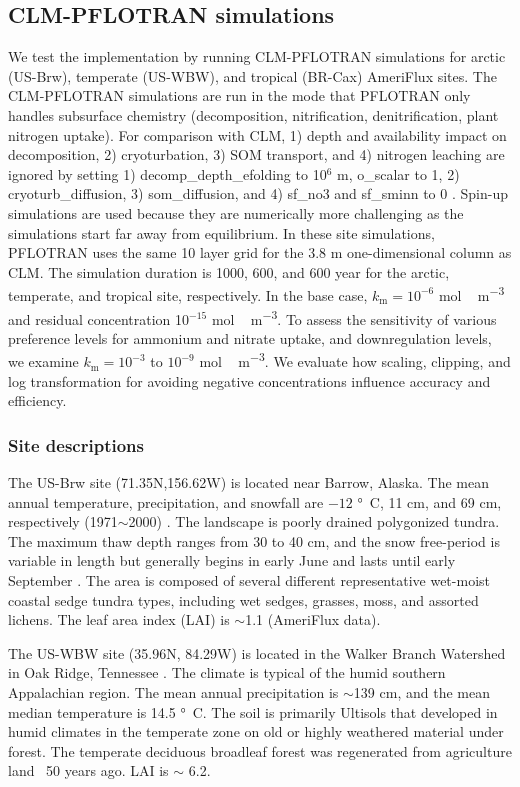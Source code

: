 \documentclass[gmd, manuscript]{copernicus}
\begin{document}
\subsection{CLM-PFLOTRAN simulations}
We test the implementation by running CLM-PFLOTRAN simulations for arctic
(US-Brw), temperate (US-WBW), and tropical (BR-Cax) AmeriFlux sites. The
CLM-PFLOTRAN simulations are run in the mode that PFLOTRAN only handles
subsurface chemistry (decomposition, nitrification, denitrification, plant
nitrogen uptake). For comparison with CLM, 1) depth and  availability
impact on decomposition, 2) cryoturbation, 3) SOM transport, and 4) nitrogen
leaching are ignored by setting 1) decomp\_depth\_efolding to 10$^6$ m,
o\_scalar to 1, 2) cryoturb\_diffusion, 3) som\_diffusion, and 4) sf\_no3 and
sf\_sminn to 0 \citep{Oleson2013}. Spin-up simulations are used because they are numerically more
challenging  as the simulations start far away from equilibrium. In these
site simulations, PFLOTRAN uses the same 10 layer grid for the 3.8 m
one-dimensional column as CLM. The simulation duration is 1000, 600, and 600
year for the arctic, temperate, and tropical site, respectively.
In the base case, $k_\text{m}=10^{-6}$ \unit{mol\,m^{-3}} and
residual concentration 10$^{-15}$ \unit{mol\,m^{-3}}. To assess the sensitivity
of various preference levels for ammonium and nitrate uptake, and
downregulation levels, we examine  $k_\text{m}=10^{-3}$ to $10^{-9}$
\unit{mol\,m^{-3}}. We evaluate how scaling, clipping, and log transformation for
avoiding negative concentrations influence accuracy and efficiency.

\subsubsection{Site descriptions}
The US-Brw site (71.35N,156.62W) is located near Barrow, Alaska. The mean annual
temperature, precipitation, and snowfall are $-12$ \unit{\degree C}, 11 cm, and
69 cm, respectively (1971$\sim$2000) \citep{Lara2012}. The landscape is poorly
drained polygonized tundra. The maximum thaw depth ranges from 30 to 40 cm, and the
snow free-period is variable in length but generally begins in early June and
lasts until early September \citep{Hinkel2003}. The area is composed of several
different representative wet-moist coastal sedge tundra types, including wet
sedges, grasses, moss, and assorted lichens. The leaf area index (LAI) is
$\sim$1.1 (AmeriFlux data).

The US-WBW site (35.96N, 84.29W) is located in the Walker Branch Watershed in
Oak Ridge, Tennessee \citep{Hanson2003}. The climate is typical of the humid
southern Appalachian region. The mean annual precipitation is $\sim$139 cm, and
the mean median temperature is 14.5 \unit{\degree C}.  
The soil is primarily Ultisols that developed in humid climates in the
temperate zone on old or highly weathered material under forest. The temperate
deciduous broadleaf forest was regenerated from agriculture land ~50 years ago.
LAI is $\sim$ 6.2\citep{Hanson2004}.
\end{document}
